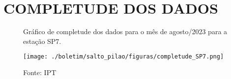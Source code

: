 \section{COMPLETUDE DOS DADOS}

\begin{figure}[htb!]
    \centering
	\captionsetup{justification=raggedright, singlelinecheck=false, width=1\textwidth}
    \caption{Gráfico de completude dos dados para o mês de agosto/2023 para a estação SP7.}
    \begin{mdframed}[
        linecolor=black,
        linewidth=1pt,
        roundcorner=10pt,
    ]
    \texttt{[image: ./boletim/salto\_pilao/figuras/completude\_SP7.png]} %
    \end{mdframed}
    \caption*{Fonte: IPT}
    \label{fig:completude}
\end{figure}


